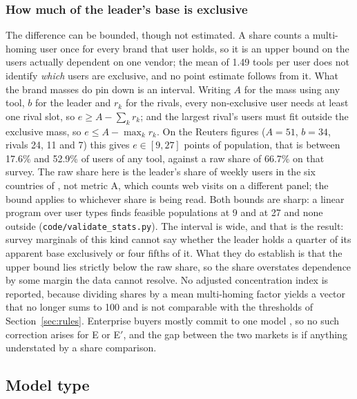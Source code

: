\documentclass[11pt]{article}
\begin{document}
\subsubsection{How much of the leader's base is exclusive} The difference can be bounded, though not estimated. A share counts a multi-homing user once for every brand that user holds, so it is an upper bound on the users actually dependent on one vendor; the mean of 1.49 tools per user does not identify \emph{which} users are exclusive, and no point estimate follows from it. What the brand masses do pin down is an interval. Writing $A$ for the mass using any tool, $b$ for the leader and $r_k$ for the rivals, every non-exclusive user needs at least one rival slot, so $e\ge A-\sum_k r_k$; and the largest rival's users must fit outside the exclusive mass, so $e\le A-\max_k r_k$. On the Reuters figures ($A=51$, $b=34$, rivals 24, 11 and 7) this gives $e\in[9,27]$ points of population, that is between 17.6\% and 52.9\% of users of any tool, against a raw share of 66.7\% on that survey. The raw share here is the leader's share of weekly users in the six countries of \cite{reuters2026genai}, not metric A, which counts web visits on a different panel; the bound applies to whichever share is being read. Both bounds are sharp: a linear program over user types finds feasible populations at 9 and at 27 and none outside (\texttt{code/validate\_stats.py}). The interval is wide, and that is the result: survey marginals of this kind cannot say whether the leader holds a quarter of its apparent base exclusively or four fifths of it. What they do establish is that the upper bound lies strictly below the raw share, so the share overstates dependence by some margin the data cannot resolve. No adjusted concentration index is reported, because dividing shares by a mean multi-homing factor yields a vector that no longer sums to 100 and is not comparable with the thresholds of Section~\ref{sec:rules}. Enterprise buyers mostly commit to one model \cite{demirer2025emerging}, so no such correction arises for E or E$'$, and the gap between the two markets is if anything understated by a share comparison.

\subsection{Model type}
\end{document}
